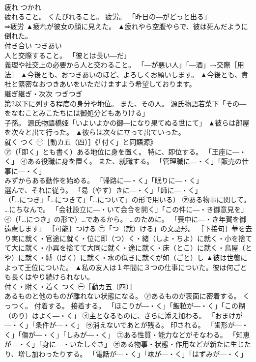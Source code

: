 \documentclass[8pt]{extreport}
\begin{document}
\begin{CJK}{UTF8}{min}
\\	疲れ	つかれ	
\\	疲れること。 くたびれること。 疲労。 「昨日の―がどっと出る」 
\\	⇒疲労	▲疲れが彼女の顔に見えた。 ▲疲れやら空腹やらで、彼は死んだように倒れた。
\\	付き合い	つきあい	
\\	人と交際すること。 「彼とは長い―だ」 
\\	義理や社交上の必要から人と交わること。 「―が悪い人」「―酒」→交際［用法］	▲今後とも、おつきあいのほど、よろしくお願いします。 ▲今後とも、貴社と緊密なおつきあいをいただけますよう希望しております。
\\	継ぎ継ぎ・次次	つぎつぎ	
\\	第2以下に列する程度の身分や地位。 また、その人。 源氏物語若菜下「その―をなむことみこたちには御処分どもありける」 
\\	子孫。 源氏物語橋姫「いよいよかの御―になり果てぬる世にて」	▲彼らは部屋を次々と出て行った。 ▲彼らは次々に立って出ていった。
\\	就く	つく	㊀［動カ五（四）］《「付く」と同語源》 
\\	㋐（「即く」とも書く）ある地位に身を置く。 特に、即位する。 「王座に―・く」 ㋑ある役職に身を置く。 また、就職する。 「管理職に―・く」「販売の仕事に―・く」 
\\	みずからある動作を始める。 「帰路に―・く」「眠りに―・く」 
\\	選んで、それに従う。 「易（やす）きに―・く」「師に―・く」 
\\	（「…につき」「…につきて」「…について」の形で用いる） ㋐ある物事に関して。 …にちなんで。 「会社設立に―・いて会合を開く」「この件に―・き御意見を」 ㋑（「…につき」の形で）…であるから。 …のために。 「喪中に―・き年賀を御遠慮します」 ［可能］つける ㊁「つ（就）ける」の文語形。 ［下接句］華を去り実に就く・官途に就く・位に即（つ）く・緒（しよ・ちよ）に就く・小を捨てて大に就く・小異を捨てて大同に就く・途に就く・床（とこ）に就く・鳥屋（とや）に就く・縛（ばく）に就く・水の低きに就くが如（ごと）し	▲彼は世襲によって王位についた。 ▲私の友人は１年間に３つの仕事についた。彼は何ごとも長くはやり続けられない。
\\	付く・附く・着く	つく	㊀［動カ五（四）］ 
\\	あるものと他のものが離れない状態になる。 ㋐あるものが表面に密着する。 くっつく。 付着する。 接着する。 「ほこりが―・く」「飯粒が―・く」「この糊（のり）はよく―・く」 ㋑主となるものに、さらに添え加わる。 「おまけが―・く」「条件が―・く」 ㋒消えないであとが残る。 印される。 「歯形が―・く」「傷が―・く」「しみが―・く」 ㋓ある性質・能力などがそなわる。 「知恵が―・く」「身に―・いたしぐさ」 ㋔ある物事・状態・作用などが新たに生じたり、増し加わったりする。 「電話が―・く」「味が―・く」「はずみが―・く」 

\end{CJK}
\end{document}
